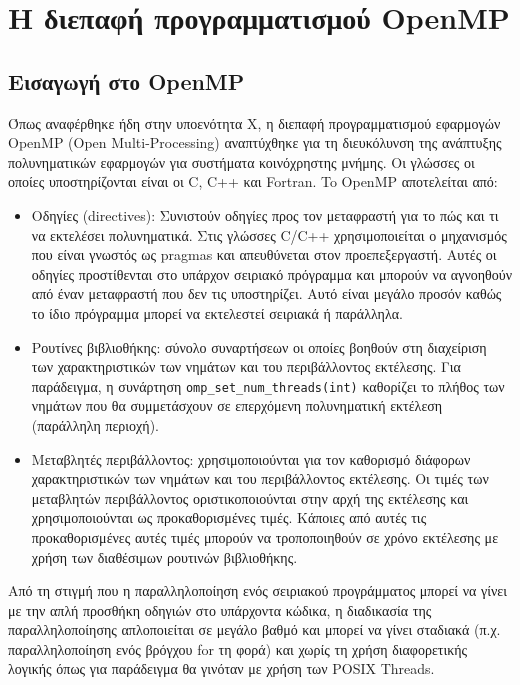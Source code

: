 \chapter{Η διεπαφή προγραμματισμού OpenMP}
\label{ch:OpenMP API}

\section{Εισαγωγή στο OpenMP}
\label{sec:Introduction to OpenMP}
Όπως αναφέρθηκε ήδη στην υποενότητα Χ, η διεπαφή προγραμματισμού εφαρμογών OpenMP (Open Multi-Processing) αναπτύχθηκε για τη διευκόλυνση της ανάπτυξης πολυνηματικών εφαρμογών για συστήματα κοινόχρηστης μνήμης. Οι γλώσσες οι οποίες υποστηρίζονται είναι οι C, C++ και Fortran.
To OpenMP αποτελείται από:
\begin{itemize}
	\item Oδηγίες (directives): Συνιστούν οδηγίες προς τον μεταφραστή για το πώς και τι να εκτελέσει πολυνηματικά. Στις γλώσσες C/C++ χρησιμοποιείται ο μηχανισμός που είναι γνωστός ως pragmas και απευθύνεται στον προεπεξεργαστή. Αυτές οι οδηγίες προστίθενται στο υπάρχον σειριακό πρόγραμμα και μπορούν να αγνοηθούν από έναν μεταφραστή που δεν τις υποστηρίζει. Αυτό είναι μεγάλο προσόν καθώς το ίδιο πρόγραμμα μπορεί να εκτελεστεί σειριακά ή παράλληλα.
	\item Ρουτίνες βιβλιοθήκης: σύνολο συναρτήσεων οι οποίες βοηθούν στη διαχείριση των χαρακτηριστικών των νημάτων και του περιβάλλοντος εκτέλεσης. Για παράδειγμα, η συνάρτηση \texttt{omp\_set\_num\_threads(int)} καθορίζει το πλήθος των νημάτων που θα συμμετάσχουν σε επερχόμενη πολυνηματική εκτέλεση (παράλληλη περιοχή).
	\item Μεταβλητές περιβάλλοντος: χρησιμοποιούνται για τον καθορισμό διάφορων χαρακτηριστικών των νημάτων και του περιβάλλοντος εκτέλεσης. Οι τιμές των μεταβλητών περιβάλλοντος οριστικοποιούνται στην αρχή της εκτέλεσης και χρησιμοποιούνται ως προκαθορισμένες τιμές. Κάποιες από αυτές τις προκαθορισμένες αυτές τιμές μπορούν να τροποποιηθούν σε χρόνο εκτέλεσης με χρήση των διαθέσιμων ρουτινών βιβλιοθήκης.
\end{itemize}

Από τη στιγμή που η παραλληλοποίηση ενός σειριακού προγράμματος μπορεί να γίνει με την απλή προσθήκη οδηγιών στο υπάρχοντα κώδικα, η διαδικασία της παραλληλοποίησης απλοποιείται σε μεγάλο βαθμό και μπορεί να γίνει σταδιακά (π.χ. παραλληλοποίηση ενός βρόγχου for τη φορά) και χωρίς τη χρήση διαφορετικής λογικής όπως για παράδειγμα θα γινόταν με χρήση των POSIX Threads. 

